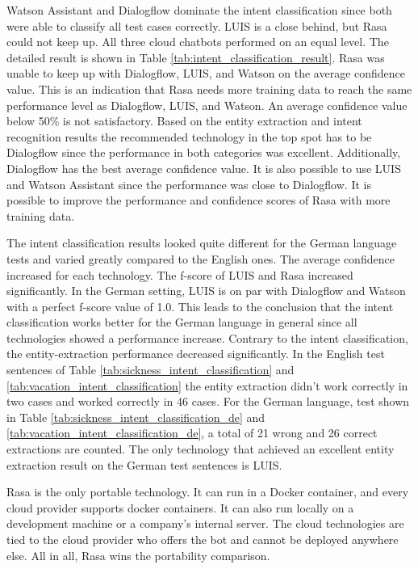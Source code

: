 Watson Assistant and Dialogflow dominate the intent classification since both were able to classify all test cases correctly.
LUIS is a close behind, but Rasa could not keep up.
All three cloud chatbots performed on an equal level.
The detailed result is shown in Table \ref{tab:intent_classification_result}.
Rasa was unable to keep up with Dialogflow, LUIS, and Watson on the  
average confidence value.
This is an indication that Rasa needs more training data to 
reach the same performance level as Dialogflow, LUIS, and Watson.
An average confidence value below 50\% is not satisfactory.
Based on the entity extraction and intent recognition results
the recommended technology in the top spot has to be Dialogflow since the performance in both categories was excellent.
Additionally, Dialogflow has the best average confidence value.
It is also possible to use LUIS and Watson Assistant since the performance was close to Dialogflow.
It is possible to improve the performance and confidence scores of Rasa with more training data.

The intent classification results looked quite different for the German language tests and varied greatly compared to the English ones.
The average confidence increased for each technology.
The f-score of LUIS and Rasa increased significantly. 
In the German setting, LUIS is on par with Dialogflow and Watson with a perfect f-score value of 1.0.
This leads to the conclusion that the intent classification works better for the German language in general since all technologies showed a performance increase.
Contrary to the intent classification, the entity-extraction performance decreased significantly.
In the English test sentences of Table \ref{tab:sickness_intent_classification} and \ref{tab:vacation_intent_classification} the entity extraction didn't work correctly in two cases and worked correctly in 46 cases.
For the German language, test shown in Table \ref{tab:sickness_intent_classification_de} and \ref{tab:vacation_intent_classification_de}, a total of 21 wrong and 26 correct extractions are counted.
The only technology that achieved an excellent entity extraction result on the German test sentences is LUIS.

Rasa is the only portable technology.
It can run in a Docker container, and every cloud provider supports docker containers.
It can also run locally on a development machine or a company's internal server.
The cloud technologies are tied to the cloud provider who offers the bot and cannot be deployed anywhere else.
All in all, Rasa wins the portability comparison.

